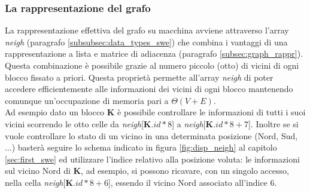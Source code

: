\subsubsection{La rappresentazione del grafo}
La rappresentazione effettiva del grafo su macchina avviene attraverso l'array \textit{neigh} (paragrafo \ref{subsubsec:data_types_swe}) che combina i vantaggi di una rappresentazione a lista e matrice di adiacenza (paragrafo \ref{subsec:graph_rappr}). Questa combinazione è possibile grazie al numero piccolo (otto) di vicini di ogni blocco fissato a priori. Questa proprietà permette all'array \textit{neigh} di poter accedere efficientemente alle informazioni dei vicini di ogni blocco mantenendo comunque un'occupazione di memoria pari a $\Theta(V+E)$.\\
Ad esempio dato un blocco \textbf{K} è possibile controllare le informazioni di tutti i suoi vicini scorrendo le otto celle da \textit{neigh}[\textbf{K}$.id*8$] a \textit{neigh}[\textbf{K}$.id*8 + 7$]. Inoltre se si vuole controllare lo stato di un vicino in una determinata posizione (Nord, Sud, $\ldots$) basterà seguire lo schema indicato in figura \ref{fig:disp_neigh} al capitolo \ref{sec:first_swe} ed utilizzare l'indice relativo alla posizione voluta: le informazioni sul vicino Nord di \textbf{K}, ad esempio, si possono ricavare, con un singolo accesso, nella cella \textit{neigh}[\textbf{K}.$id*8 + 6$], essendo il vicino Nord associato all'indice 6.

